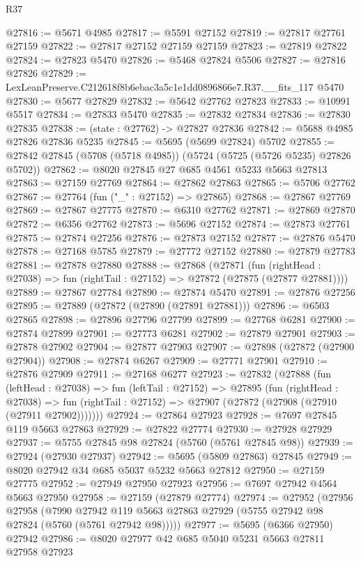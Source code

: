 \begin{lexlean}{R37}
\begin{coremodule}
@27816 := @5671 @4985
@27817 := @5591 @27152
@27819 := @27817 @27761 @27159
@27822 := @27817 @27152 @27159 @27159
@27823 := @27819 @27822
@27824 := @27823 @5470
@27826 := @5468 @27824 @5506
@27827 := @27816 @27826
@27829 := LexLeanPreserve.C212618f8b6ebac3a5c1e1dd0896866e7.R37.__fits_117 @5470
@27830 := @5677 @27829
@27832 := @5642 @27762 @27823
@27833 := @10991 @5517
@27834 := @27833 @5470
@27835 := @27832 @27834
@27836 := @27830 @27835
@27838 := (state : @27762) -> @27827 @27836
@27842 := @5688 @4985 @27826 @27836 @5235
@27845 := @5695 (@5699 @27824) @5702
@27855 := @27842 @27845 (@5708 (@5718 @4985)) (@5724 (@5725 (@5726 @5235) @27826 @5702))
@27862 := @8020 @27845 @27 @685 @4561 @5233 @5663 @27813
@27863 := @27159 @27769
@27864 := @27862 @27863
@27865 := @5706 @27762
@27867 := @27764 (fun ("_" : @27152) => @27865)
@27868 := @27867 @27769
@27869 := @27867 @27775
@27870 := @6310 @27762
@27871 := @27869 @27870
@27872 := @6356 @27762
@27873 := @5696 @27152
@27874 := @27873 @27761
@27875 := @27874 @27256
@27876 := @27873 @27152
@27877 := @27876 @5470
@27878 := @27168 @5785
@27879 := @27772 @27152
@27880 := @27879 @27783
@27881 := @27878 @27880
@27888 := @27868
    (@27871
      (fun (rightHead : @27038) => fun (rightTail : @27152) => @27872 (@27875 (@27877 @27881))))
@27889 := @27867 @27784
@27890 := @27874 @5470
@27891 := @27876 @27256
@27895 := @27889 (@27872 (@27890 (@27891 @27881)))
@27896 := @6503 @27865
@27898 := @27896 @27796 @27799
@27899 := @27768 @6281
@27900 := @27874 @27899
@27901 := @27773 @6281
@27902 := @27879 @27901
@27903 := @27878 @27902
@27904 := @27877 @27903
@27907 := @27898 (@27872 (@27900 @27904))
@27908 := @27874 @6267
@27909 := @27771 @27901
@27910 := @27876 @27909
@27911 := @27168 @6277
@27923 := @27832
    (@27888
      (fun (leftHead : @27038) =>
      fun (leftTail : @27152) =>
      @27895
        (fun (rightHead : @27038) =>
        fun (rightTail : @27152) => @27907 (@27872 (@27908 (@27910 (@27911 @27902)))))))
@27924 := @27864 @27923
@27928 := @7697 @27845 @119 @5663 @27863
@27929 := @27822 @27774
@27930 := @27928 @27929
@27937 := @5755 @27845 @98 @27824 (@5760 (@5761 @27845 @98))
@27939 := @27924 (@27930 @27937)
@27942 := @5695 (@5809 @27863) @27845
@27949 := @8020 @27942 @34 @685 @5037 @5232 @5663 @27812
@27950 := @27159 @27775
@27952 := @27949 @27950 @27923
@27956 := @7697 @27942 @4564 @5663 @27950
@27958 := @27159 (@27879 @27774)
@27974 := @27952
    (@27956
      @27958
      (@7990 @27942 @119 @5663 @27863 @27929 (@5755 @27942 @98 @27824 (@5760 (@5761 @27942 @98)))))
@27977 := @5695 (@6366 @27950) @27942
@27986 := @8020 @27977 @42 @685 @5040 @5231 @5663 @27811 @27958 @27923

\end{coremodule}
\end{lexlean}
